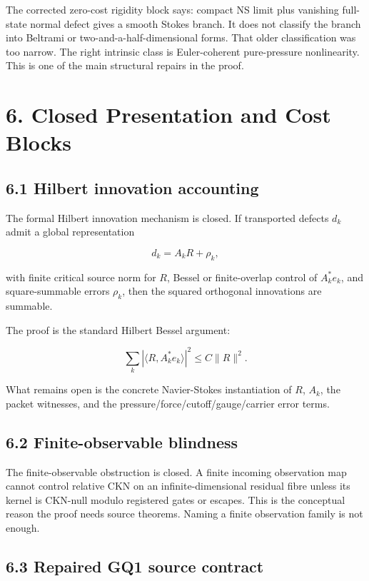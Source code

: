 \documentclass[11pt]{article}
\begin{document}
The corrected zero-cost rigidity block says: compact NS limit plus vanishing full-state normal defect gives a smooth Stokes branch. It does not classify the branch into Beltrami or two-and-a-half-dimensional forms. That older classification was too narrow. The right intrinsic class is Euler-coherent pure-pressure nonlinearity. This is one of the main structural repairs in the proof.

\section*{6. Closed Presentation and Cost Blocks}

\subsection*{6.1 Hilbert innovation accounting}

The formal Hilbert innovation mechanism is closed. If transported defects \(d_k\) admit a global representation

\[d_k=A_kR+\rho_k,\]

with finite critical source norm for \(R\), Bessel or finite-overlap control of \(A_k^*e_k\), and square-summable errors \(\rho_k\), then the squared orthogonal innovations are summable.

The proof is the standard Hilbert Bessel argument:

\[\sum_k |\langle R,A_k^*e_k\rangle|^2 \le C\|R\|^2.\]

What remains open is the concrete Navier-Stokes instantiation of \(R\), \(A_k\), the packet witnesses, and the pressure/force/cutoff/gauge/carrier error terms.

\subsection*{6.2 Finite-observable blindness}

The finite-observable obstruction is closed. A finite incoming observation map cannot control relative CKN on an infinite-dimensional residual fibre unless its kernel is CKN-null modulo registered gates or escapes. This is the conceptual reason the proof needs source theorems. Naming a finite observation family is not enough.

\subsection*{6.3 Repaired GQ1 source contract}
\end{document}
